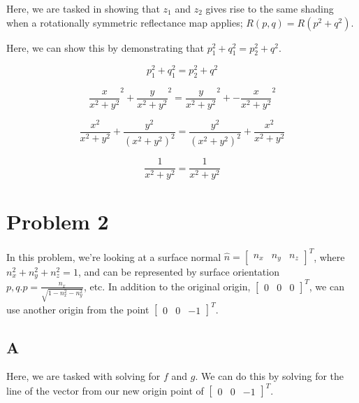 \documentclass{article}
\begin{document}
Here, we are tasked in showing that $z_1$ and $z_2$ gives rise to the same shading when a rotationally symmetric reflectance map applies; $R(p,q) = R(p^2 + q^2)$.

Here, we can show this by demonstrating that $p_1^2 + q_1^2 = p_2^2 + q^2$.

\begin{equation}
    p_1^2 + q_1^2 = p_2^2 + q^2
\end{equation}

\begin{equation}
    \frac{x}{x^2+y^2}^2 + \frac{y}{x^2+y^2}^2 = \frac{y}{x^2 + y^2}^2 + -\frac{x}{x^2+y^2}^2
\end{equation}

\begin{equation}
    \frac{x^2}{x^2+y^2} + \frac{y^2}{(x^2+y^2)^2} = \frac{y^2}{(x^2+y^2)^2} + \frac{x^2}{x^2+y^2}
\end{equation}

\begin{equation}
    \frac{1}{x^2+y^2} = \frac{1}{x^2+y^2}
\end{equation}

\noindent


\section{Problem 2}

In this problem, we're looking at a surface normal $\hat{n}=\begin{bmatrix}n_x & n_y & n_z\end{bmatrix}^T$, where $n_x^2 + n_y^2 + n_z^2 = 1$, and can be represented by surface orientation $p,q.p = \frac{n_x}{\sqrt{1-n_x^2-n_y^2}}$, etc. In addition to the original origin, $\begin{bmatrix}0 & 0 & 0 \end{bmatrix}^T$, we can use another origin from the point $\begin{bmatrix}0 & 0 & -1 \end{bmatrix}^T$.

\subsection*{A}

Here, we are tasked with solving for $f$ and $g$. We can do this by solving for the line of the vector from our new origin point of $\begin{bmatrix}0 & 0 & -1 \end{bmatrix}^T$.
\end{document}
